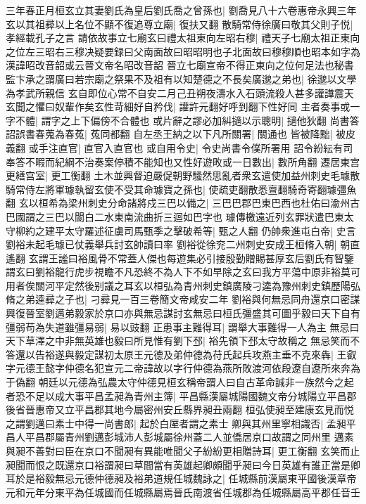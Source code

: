 三年春正月桓玄立其妻劉氏為皇后劉氏喬之曾孫也|{
	劉喬見八十六卷惠帝永興三年}
玄以其祖彛以上名位不顯不復追尊立廟|{
	復扶又翻}
散騎常侍徐廣曰敬其父則子悦|{
	孝經載孔子之言}
請依故事立七廟玄曰禮太祖東向左昭右穆|{
	禮天子七廟太祖正東向之位左三昭右三穆决疑要録曰父南面故曰昭昭明也子北面故曰穆穆順也昭本如字為漢諱昭改音韶或云晉文帝名昭改音韶}
晉立七廟宣帝不得正東向之位何足法也秘書監卞承之謂廣曰若宗廟之祭果不及祖有以知楚德之不長矣廣邈之弟也|{
	徐邈以文學為孝武所親信}
玄自即位心常不自安二月己丑朔夜濤水入石頭流殺人甚多讙譁震天玄聞之懼曰奴輩作矣玄性苛細好自矜伐|{
	讙許元翻好呼到翻下性好同}
主者奏事或一字不體|{
	謂字之上下偏傍不合體也}
或片辭之謬必加糾擿以示聰明|{
	擿他狄翻}
尚書答詔誤書春蒐為春菟|{
	菟同都翻}
自左丞王納之以下凡所關署|{
	關通也}
皆被降黜|{
	被皮義翻}
或手注直官|{
	直官入直官也}
或自用令史|{
	令史尚書令僕所署用}
詔令紛紜有司奉答不暇而紀綱不治奏案停積不能知也又性好遊畋或一日數出|{
	數所角翻}
遷居東宫更繕宫室|{
	更工衡翻}
土木並興督迫嚴促朝野騷然思亂者衆玄遣使加益州刺史毛璩散騎常侍左將軍璩執留玄使不受其命璩寶之孫也|{
	使疏吏翻散悉亶翻騎奇寄翻璩彊魚翻}
玄以桓希為梁州刺史分命諸將戍三巴以備之|{
	三巴巴郡巴東巴西也杜佑曰渝州古巴國謂之三巴以閬白二水東南流曲折三迴如巴字也}
璩傳檄遠近列玄罪狀遣巴東太守柳約之建平太守羅述征虜司馬甄季之擊破希等|{
	甄之人翻}
仍帥衆進屯白帝|{
	史言劉裕未起毛璩已仗義舉兵討玄帥讀曰率}
劉裕從徐兖二州刺史安成王桓脩入朝|{
	朝直遙翻}
玄謂王謐曰裕風骨不常蓋人傑也每遊集必引接殷勤贈賜甚厚玄后劉氏有智鑒謂玄曰劉裕龍行虎步視瞻不凡恐終不為人下不如早除之玄曰我方平蕩中原非裕莫可用者俟關河平定然後别議之耳玄以桓弘為青州刺史鎮廣陵刁逵為豫州刺史鎮歷陽弘脩之弟逵彛之子也|{
	刁彛見一百三卷簡文帝咸安二年}
劉裕與何無忌同舟還京口密謀興復晉室劉邁弟毅家於京口亦與無忌謀討玄無忌曰桓氏彊盛其可圖乎毅曰天下自有彊弱苟為失道雖彊易弱|{
	易以豉翻}
正患事主難得耳|{
	謂舉大事難得一人為主}
無忌曰天下草澤之中非無英雄也毅曰所見惟有劉下邳|{
	裕先領下邳太守故稱之}
無忌笑而不答還以告裕遂與毅定謀初太原王元德及弟仲德為苻氏起兵攻燕主垂不克來犇|{
	王叡字元德王懿字仲德名犯宣元二帝諱故以字行仲德為燕所敗渡河依段遼自遼所來奔為于偽翻}
朝廷以元德為弘農太守仲德見桓玄稱帝謂人曰自古革命誠非一族然今之起者恐不足以成大事平昌孟昶為青州主簿|{
	平昌縣漢屬城陽國魏文帝分城陽立平昌郡後省晉惠帝又立平昌郡其地今屬密州安丘縣界昶丑兩翻}
桓弘使昶至建康玄見而悦之謂劉邁曰素士中得一尚書郎|{
	起於白厔者謂之素士}
卿與其州里寧相識否|{
	孟昶平昌人平昌郡屬青州劉邁彭城沛人彭城屬徐州蓋二人並僑居京口故謂之同州里}
邁素與昶不善對曰臣在京口不聞昶有異能唯聞父子紛紛更相贈詩耳|{
	更工衡翻}
玄笑而止昶聞而恨之既還京口裕謂昶曰草間當有英雄起卿頗聞乎昶曰今日英雄有誰正當是卿耳於是裕毅無忌元德仲德昶及裕弟道規任城魏詠之|{
	任城縣前漢屬東平國後漢章帝元和元年分東平為任城國而任城縣屬焉晉氏南渡省任城郡為任城縣屬高平郡任音壬}
